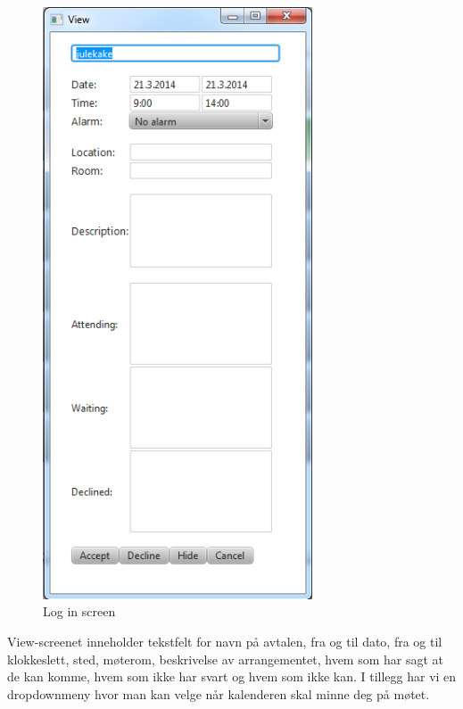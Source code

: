 \documentclass{article}
\begin{document}
\begin{figure}[h!] 
    \begin{center} 
        \includegraphics[width=8cm]{ViewScreen.png}
        \caption{Log in screen}
    \label{login}
    \end{center}
\end{figure}
View-screenet inneholder tekstfelt for navn på avtalen, fra og til dato, fra og til klokkeslett, sted, møterom, beskrivelse av arrangementet, hvem som har sagt at de kan komme, hvem som ikke har svart og hvem som ikke kan. I tillegg har vi en dropdownmeny hvor man kan velge når kalenderen skal minne deg på møtet.

\end{document}
